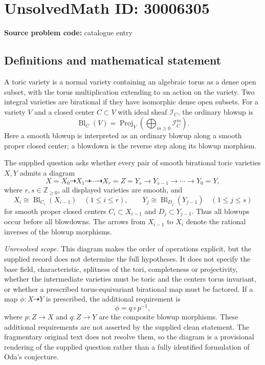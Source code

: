 \documentclass[11pt]{article}
\newcommand{\Z}{\mathbb{Z}}
\begin{document}
\section*{UnsolvedMath ID: 30006305}
\textbf{Source problem code:} catalogue entry
\subsection{Definitions and mathematical statement}
A toric variety is a normal variety containing an algebraic torus as a dense open subset, with the torus multiplication extending to an action on the variety. Two integral varieties are birational if they have isomorphic dense open subsets. For a variety \(V\) and a closed center \(C\subset V\) with ideal sheaf \(\mathcal I_C\), the ordinary blowup is
\[
\operatorname{Bl}_C(V)=\operatorname{Proj}_V\!\left(\bigoplus_{m\geq 0}\mathcal I_C^m\right).
\]
Here a smooth blowup is interpreted as an ordinary blowup along a smooth proper closed center; a blowdown is the reverse step along its blowup morphism.

The supplied question asks whether every pair of smooth birational toric varieties \(X,Y\) admits a diagram
\[
X=X_0\dashrightarrow X_1\dashrightarrow\cdots\dashrightarrow X_r=Z=Y_s\longrightarrow Y_{s-1}\longrightarrow\cdots\longrightarrow Y_0=Y,
\]
where \(r,s\in\Z_{\geq 0}\), all displayed varieties are smooth, and
\[
X_i\cong\operatorname{Bl}_{C_i}(X_{i-1})\quad(1\leq i\leq r),\qquad
Y_j\cong\operatorname{Bl}_{D_j}(Y_{j-1})\quad(1\leq j\leq s)
\]
for smooth proper closed centers \(C_i\subset X_{i-1}\) and \(D_j\subset Y_{j-1}\). Thus all blowups occur before all blowdowns. The arrows from \(X_{i-1}\) to \(X_i\) denote the rational inverses of the blowup morphisms.

\emph{Unresolved scope.} This diagram makes the order of operations explicit, but the supplied record does not determine the full hypotheses. It does not specify the base field, characteristic, splitness of the tori, completeness or projectivity, whether the intermediate varieties must be toric and the centers torus invariant, or whether a prescribed torus-equivariant birational map must be factored. If a map \(\phi\colon X\dashrightarrow Y\) is prescribed, the additional requirement is
\[
\phi=q\circ p^{-1},
\]
where \(p\colon Z\to X\) and \(q\colon Z\to Y\) are the composite blowup morphisms. These additional requirements are not asserted by the supplied clean statement. The fragmentary original text does not resolve them, so the diagram is a provisional rendering of the supplied question rather than a fully identified formulation of Oda's conjecture.
\end{document}
